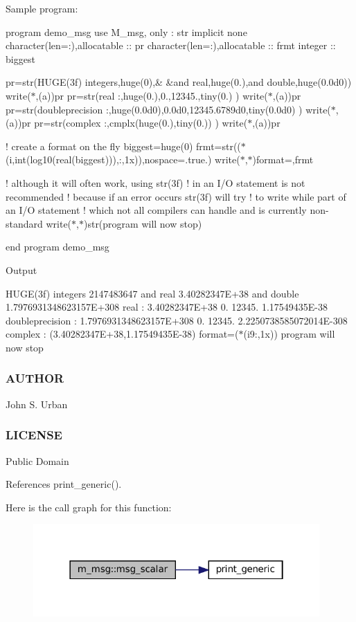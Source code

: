 Sample program\+:

program demo\+\_\+msg use M\+\_\+msg, only \+: str implicit none character(len=\+:),allocatable \+:\+: pr character(len=\+:),allocatable \+:\+: frmt integer \+:\+: biggest

pr=str(\textquotesingle{}H\+U\+G\+E(3f) integers\textquotesingle{},huge(0),\& \&\textquotesingle{}and real\textquotesingle{},huge(0.),\textquotesingle{}and double\textquotesingle{},huge(0.\+0d0)) write($\ast$,\textquotesingle{}(a)\textquotesingle{})pr pr=str(\textquotesingle{}real \+:\textquotesingle{},huge(0.),0.,12345.,tiny(0.) ) write($\ast$,\textquotesingle{}(a)\textquotesingle{})pr pr=str(\textquotesingle{}doubleprecision \+:\textquotesingle{},huge(0.\+0d0),0.\+0d0,12345.\+6789d0,tiny(0.\+0d0) ) write($\ast$,\textquotesingle{}(a)\textquotesingle{})pr pr=str(\textquotesingle{}complex \+:\textquotesingle{},cmplx(huge(0.),tiny(0.)) ) write($\ast$,\textquotesingle{}(a)\textquotesingle{})pr

! create a format on the fly biggest=huge(0) frmt=str(\textquotesingle{}($\ast$(i\textquotesingle{},int(log10(real(biggest))),\textquotesingle{}\+:,1x))\textquotesingle{},nospace=.true.) write($\ast$,$\ast$)\textquotesingle{}format=\textquotesingle{},frmt

! although it will often work, using str(3f) ! in an I/O statement is not recommended ! because if an error occurs str(3f) will try ! to write while part of an I/O statement ! which not all compilers can handle and is currently non-\/standard write($\ast$,$\ast$)str(\textquotesingle{}program will now stop\textquotesingle{})

end program demo\+\_\+msg

Output

H\+U\+G\+E(3f) integers 2147483647 and real 3.\+40282347E+38 and double 1.\+7976931348623157E+308 real \+: 3.\+40282347E+38 0. 12345. 1.\+17549435E-\/38 doubleprecision \+: 1.\+7976931348623157E+308 0. 12345. 2.\+2250738585072014E-\/308 complex \+: (3.\+40282347E+38,1.\+17549435E-\/38) format=($\ast$(i9\+:,1x)) program will now stop

\subsubsection*{A\+U\+T\+H\+OR}

John S. Urban

\subsubsection*{L\+I\+C\+E\+N\+SE}

Public Domain 

References print\+\_\+generic().

Here is the call graph for this function\+:\nopagebreak
\begin{figure}[H]
\begin{center}
\leavevmode
\includegraphics[width=310pt]{namespacem__msg_a2e19921e3e57824c605acd4f7c83ad83_cgraph}
\end{center}
\end{figure}
